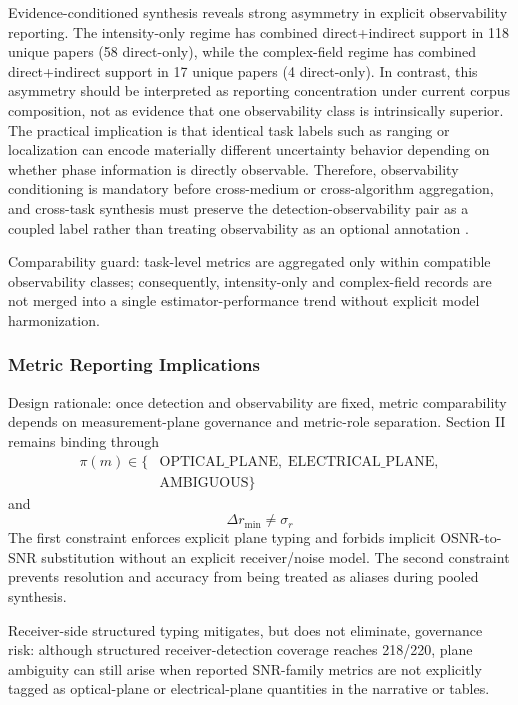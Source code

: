 \documentclass[lettersize,journal]{IEEEtran}
\begin{document}
Evidence-conditioned synthesis reveals strong asymmetry in explicit observability reporting. The intensity-only regime has combined direct+indirect support in 118 unique papers (58 direct-only), while the complex-field regime has combined direct+indirect support in 17 unique papers (4 direct-only). In contrast, this asymmetry should be interpreted as reporting concentration under current corpus composition, not as evidence that one observability class is intrinsically superior. The practical implication is that identical task labels such as ranging or localization can encode materially different uncertainty behavior depending on whether phase information is directly observable. Therefore, observability conditioning is mandatory before cross-medium or cross-algorithm aggregation, and cross-task synthesis must preserve the detection-observability pair as a coupled label rather than treating observability as an optional annotation \cite{O_ISAC_021,O_ISAC_082,O_ISAC_039,O_ISAC_056}.

Comparability guard: task-level metrics are aggregated only within compatible observability classes; consequently, intensity-only and complex-field records are not merged into a single estimator-performance trend without explicit model harmonization.

\subsubsection{Metric Reporting Implications}
Design rationale: once detection and observability are fixed, metric comparability depends on measurement-plane governance and metric-role separation. Section II remains binding through
\begin{equation}
\begin{aligned}
\pi(m)\in\{&\text{OPTICAL\_PLANE},\;\text{ELECTRICAL\_PLANE},\\
&\text{AMBIGUOUS}\}
\end{aligned}
\end{equation}
and
\begin{equation}
\Delta r_{\min}\neq \sigma_r
\end{equation}
The first constraint enforces explicit plane typing and forbids implicit OSNR-to-SNR substitution without an explicit receiver/noise model. The second constraint prevents resolution and accuracy from being treated as aliases during pooled synthesis.

Receiver-side structured typing mitigates, but does not eliminate, governance risk: although structured receiver-detection coverage reaches 218/220, plane ambiguity can still arise when reported SNR-family metrics are not explicitly tagged as optical-plane or electrical-plane quantities in the narrative or tables.
\end{document}
